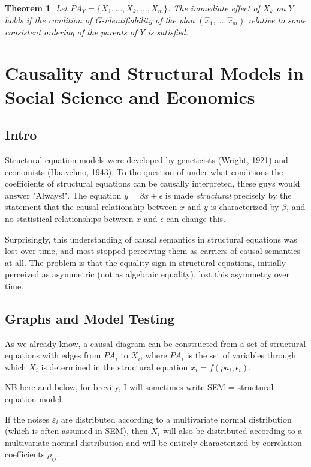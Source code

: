 \documentclass[fleqn]{article}
\newtheorem{theorem}{Theorem}
\numberwithin{equation}{section}
\numberwithin{theorem}{section}
\numberwithin{figure}{section}
\numberwithin{lemma}{section}
\numberwithin{corollary}{section}
\begin{document}
\begin{theorem}
	Let $PA_Y = \{X_1,...,X_k,...,X_m\}$. The immediate effect of $X_k$ on $Y$ holds if the condition of G-identifiability of the plan $(\hat x_1,...,\hat x_m)$ relative to some consistent ordering of the parents of $Y$ is satisfied.
\end{theorem}

\section{Causality and Structural Models in Social Science and Economics}

\subsection*{Intro}

Structural equation models were developed by geneticists (Wright, 1921) and economists (Haavelmo, 1943). To the question of under what conditions the coefficients of structural equations can be causally interpreted, these guys would answer "Always!". The equation $y = \beta x + \epsilon$ is made \textit{structural} precisely by the statement that the causal relationship between $x$ and $y$ is characterized by $\beta$, and no statistical relationships between $x$ and $\epsilon$ can change this.

Surprisingly, this understanding of causal semantics in structural equations was lost over time, and most stopped perceiving them as carriers of causal semantics at all. The problem is that the equality sign in structural equations, initially perceived as asymmetric (not as algebraic equality), lost this asymmetry over time.

\subsection*{Graphs and Model Testing}

As we already know, a causal diagram can be constructed from a set of structural equations with edges from $PA_i$ to $X_i$, where $PA_i$ is the set of variables through which $X_i$ is determined in the structural equation $x_i = f(pa_i, \epsilon_i)$.

NB here and below, for brevity, I will sometimes write SEM = structural equation model.

If the noises $\varepsilon_i$ are distributed according to a multivariate normal distribution (which is often assumed in SEM), then $X_i$ will also be distributed according to a multivariate normal distribution and will be entirely characterized by correlation coefficients $\rho_{ij}$.
\end{document}
